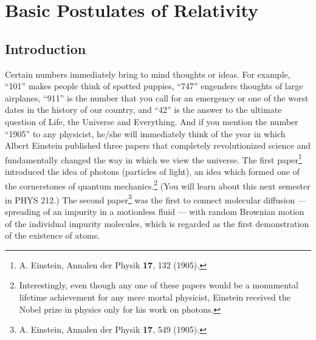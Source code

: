 \chapter{Basic Postulates of Relativity}
\label{chapter:relativityI}

%
%
%

\section{Introduction}

Certain numbers immediately bring to mind thoughts or ideas.  For
example, ``101'' makes people think of spotted puppies, ``747''
engenders thoughts of large airplanes, ``911'' is the number that you
call for an emergency or one of the worst dates in the history of our
country, and ``42'' is the answer to the ultimate question of Life,
the Universe and Everything.  And if you mention the number ``1905''
to any physicist, he/she will immediately think of the year in which
Albert Einstein published three papers that completely revolutionized
science and fundamentally changed the way in which we view the
universe.  The first paper\footnote{A. Einstein, Annalen der Physik
  {\bf 17}, 132 (1905).} introduced the idea of photons (particles of
light), an idea which formed one of the cornerstones of quantum
mechanics.\footnote{Interestingly, even though any one of these papers
  would be a monumental lifetime achievement for any mere mortal
  physicist, Einstein received the Nobel prize in physics only for his
  work on photons.}  (You will learn about this next semester in PHYS
212.)  The second paper\footnote{A. Einstein, Annalen der Physik {\bf
    17}, 549 (1905).}  was the first to connect molecular diffusion
--- spreading of an impurity in a motionless fluid --- with random
Brownian motion of the individual impurity molecules, which is regarded
as the first demonstration of the existence of atoms.
   

